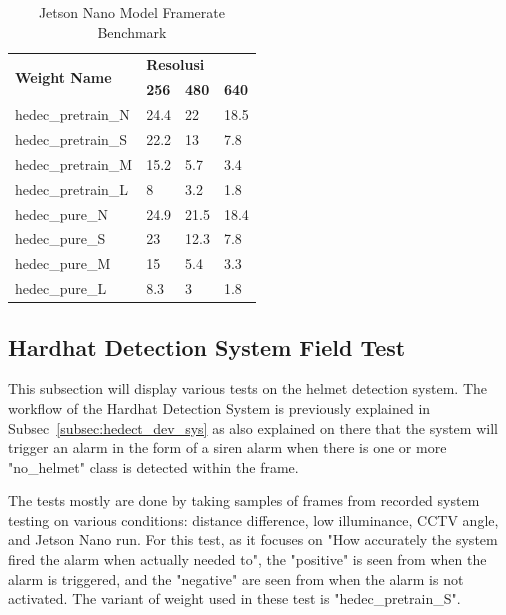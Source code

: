 \begin{table}
  \centering
  \caption{Jetson Nano Model Framerate Benchmark}
  \label{tb:jetsonano_model_benchmark}
  \begin{tabular}{|l|l|l|l|} 
    \hline
    \multirow{2}{*}{\textbf{Weight Name}} & \multicolumn{3}{l|}{\textbf{Resolusi}}      \\ 
    \cline{2-4}
                                         & \textbf{256} & \textbf{480} & \textbf{640}  \\ 
    \hline
    hedec\_pretrain\_N                   & 24.4         & 22           & 18.5          \\
    hedec\_pretrain\_S                   & 22.2         & 13           & 7.8           \\
    hedec\_pretrain\_M                   & 15.2         & 5.7          & 3.4           \\
    hedec\_pretrain\_L                   & 8            & 3.2          & 1.8           \\
    hedec\_pure\_N                       & 24.9         & 21.5         & 18.4          \\
    hedec\_pure\_S                       & 23           & 12.3         & 7.8           \\
    hedec\_pure\_M                       & 15           & 5.4          & 3.3           \\
    hedec\_pure\_L                       & 8.3          & 3            & 1.8           \\
    \hline
  \end{tabular}
\end{table}


\subsection{Hardhat Detection System Field Test}
\label{subsec:hedect_sys_test}

\par This subsection will display various tests on the helmet detection system. The workflow of the Hardhat Detection System is previously explained in Subsec~\ref{subsec:hedect_dev_sys} as also explained on there that the system will trigger an alarm in the form of a siren alarm when there is one or more "no\_helmet" class is detected within the frame. 

\par The tests mostly are done by taking samples of frames from recorded system testing on various conditions: distance difference, low illuminance, CCTV angle, and Jetson Nano run. For this test, as it focuses on "How accurately the system fired the alarm when actually needed to", the "positive" is seen from when the alarm is triggered, and the "negative" are seen from when the alarm is not activated. The variant of weight used in these test is "hedec\_pretrain\_S".

